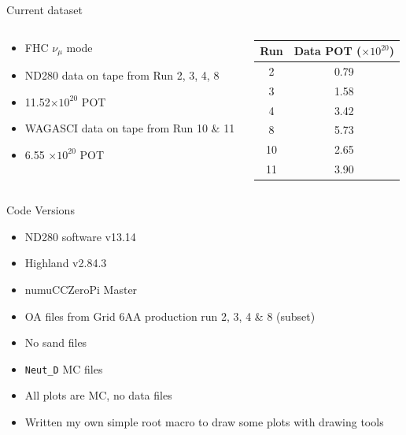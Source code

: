 \documentclass{beamer}
\begin{document}
\begin{frame}{Current dataset}

\begin{columns}[c]
\begin{column}{.5\textwidth}
\begin{itemize}
    \item FHC ${\nu}_{\mu}$ mode 
    \item ND280 data on tape from Run 2, 3, 4, 8
    \item 11.52$\times10^{20}$ POT
    \item WAGASCI data on tape from Run 10 \& 11
    \item 6.55 $\times10^{20}$ POT
\end{itemize}    
\end{column}
\begin{column}{.5\textwidth}

\begin{table}[htp]
\begin{ruledtabular}
\begin{tabular}{c|c}
\hline
\hline 
Run & Data POT ($\times10^{20}$)\\
	\hline
 2 & 0.79 \\
 3 & 1.58 \\
 4 & 3.42 \\
8 & 5.73 \\
 10 & 2.65 \\
 11 & 3.90 \\ 
\hline
\hline 
\end{tabular}
\end{ruledtabular}
\end{table}

\end{column}
\end{columns}

\end{frame}

\begin{frame}{Code Versions}
\begin{itemize}
    \item ND280 software v13.14
    \item Highland v2.84.3
    \item numuCCZeroPi Master
    \item OA files from Grid 6AA production run 2, 3, 4 \& 8 (subset)
    \item No sand files
    \item \texttt{Neut\_D} MC files
    \item All plots are MC, no data files
    \item Written my own simple root macro to draw some plots with drawing tools
   \end{itemize}
\end{frame}
\end{document}
